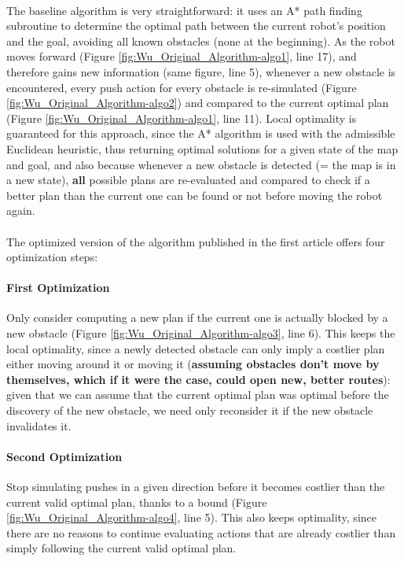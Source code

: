 \paragraph{} The baseline algorithm is very straightforward: it uses an A* path finding subroutine to determine the optimal path between the current robot's position and the goal, avoiding all known obstacles (none at the beginning). As the robot moves forward (Figure \ref{fig:Wu_Original_Algorithm-algo1}, line 17), and therefore gains new information (same figure, line 5), whenever a new obstacle is encountered, every push action for every obstacle is re-simulated (Figure \ref{fig:Wu_Original_Algorithm-algo2}) and compared to the current optimal plan (Figure \ref{fig:Wu_Original_Algorithm-algo1}, line 11). Local optimality is guaranteed for this approach, since the A* algorithm is used with the admissible Euclidean heuristic, thus returning optimal solutions for a given state of the map and goal, and also because whenever a new obstacle is detected (= the map is in a new state), \textbf{all} possible plans are re-evaluated and compared to check if a better plan than the current one can be found or not before moving the robot again.

\paragraph{} The optimized version of the algorithm published in the first article offers four optimization steps:

\paragraph{First Optimization}\label{optimization_1} Only consider computing a new plan if the current one is actually blocked by a new obstacle (Figure \ref{fig:Wu_Original_Algorithm-algo3}, line 6). This keeps the local optimality, since a newly detected obstacle can only imply a costlier plan either moving around it or moving it (\textbf{assuming obstacles don't move by themselves, which if it were the case, could open new, better routes}): given that we can assume that the current optimal plan was optimal before the discovery of the new obstacle, we need only reconsider it if the new obstacle invalidates it.

\paragraph{Second Optimization}\label{optimization_2} Stop simulating pushes in a given direction before it becomes costlier than the current valid optimal plan, thanks to a bound (Figure \ref{fig:Wu_Original_Algorithm-algo4}, line 5). This also keeps optimality, since there are no reasons to continue evaluating actions that are already costlier than simply following the current valid optimal plan.

